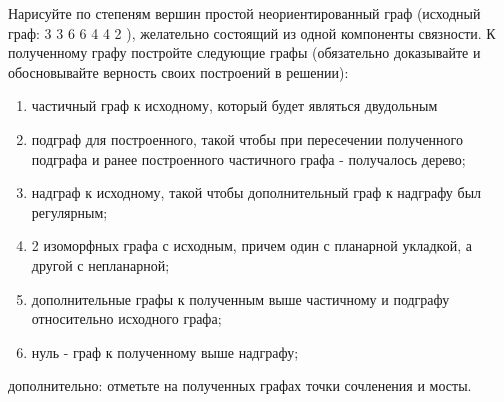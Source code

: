 \question
Нарисуйте по степеням вершин простой неориентированный граф (исходный граф: 3 3 6 6 4 4 2 ), желательно состоящий из одной компоненты связности. 
К полученному графу постройте следующие графы (обязательно доказывайте и  обосновывайте верность своих построений в решении):
\begin{enumerate}
\item   частичный граф к исходному, который будет являться двудольным
\item   подграф для построенного, такой чтобы при пересечении полученного подграфа и ранее построенного частичного графа - получалось дерево;
\item   надграф к исходному, такой чтобы  дополнительный граф к надграфу был  регулярным;
\item   2 изоморфных графа с исходным, причем один с планарной укладкой, а другой с непланарной;
\item   дополнительные графы к полученным выше частичному и подграфу относительно исходного графа;
\item   нуль - граф к полученному выше надграфу;
\end{enumerate}
дополнительно: отметьте на полученных графах точки сочленения и мосты.
